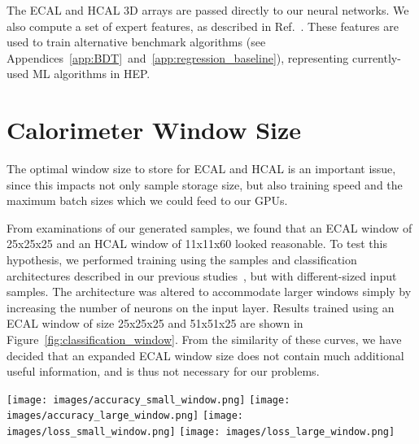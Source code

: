 The ECAL and HCAL 3D arrays are passed directly to our neural networks. We also compute a set of expert features, as described in Ref.~\cite{NIPS}. These features are used to train alternative benchmark algorithms (see Appendices~\ref{app:BDT}~and~\ref{app:regression_baseline}), representing currently-used ML algorithms in HEP.

\section{Calorimeter Window Size}\label{app:window_size}

The optimal window size to store for ECAL and HCAL is an important issue, since this impacts not only sample storage size, but also training speed and the maximum batch sizes which we could feed to our GPUs. 

From examinations of our generated samples, we found that an ECAL window of 25x25x25 and an HCAL window of 11x11x60 looked reasonable. To test this hypothesis, we performed training using the samples and classification architectures described in our previous studies~\cite{NIPS}, but with different-sized input samples. The architecture was altered to accommodate larger windows simply by increasing the number of neurons on the input layer. Results trained using an ECAL window of size 25x25x25 and 51x51x25 are shown in Figure~\ref{fig:classification_window}. From the similarity of these curves, we have decided that an expanded ECAL window size does not contain much additional useful information, and is thus not necessary for our problems.

\begin{figure*}[htbp]
\centering
\texttt{[image: images/accuracy\_small\_window.png]}
\texttt{[image: images/accuracy\_large\_window.png]}
\texttt{[image: images/loss\_small\_window.png]}
\texttt{[image: images/loss\_large\_window.png]}
\caption{Training history for different choices of the input 3D array zise: Accuracy (top) and loss (bottom) as a function of the training batch for photon/neutral pion classification, using a 25x25x25 (left) and 51x51x25 (right) ECAL window size.\label{fig:classification_window}}
\end{figure*}
